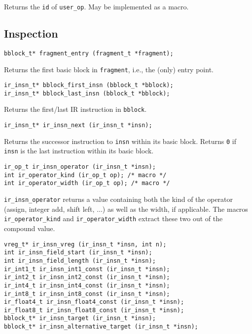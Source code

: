 \documentclass{article}
\newcommand{\cc}[1]{\texttt{#1}} %
\begin{document}
Returns the \cc{id} of \cc{user\_op}.  May be implemented as a macro.

\subsection{Inspection}

\begin{verbatim}
bblock_t* fragment_entry (fragment_t *fragment);
\end{verbatim}

Returns the first basic block in \cc{fragment}, i.e., the (only) entry
point.

\begin{verbatim}
ir_insn_t* bblock_first_insn (bblock_t *bblock);
ir_insn_t* bblock_last_insn (bblock_t *bblock);
\end{verbatim}

Returns the first/last IR instruction in \cc{bblock}.

\begin{verbatim}
ir_insn_t* ir_insn_next (ir_insn_t *insn);
\end{verbatim}

Returns the successor instruction to \cc{insn} within its basic block.
Returns \cc{0} if \cc{insn} is the last instruction within its basic
block.

\begin{verbatim}
ir_op_t ir_insn_operator (ir_insn_t *insn);
int ir_operator_kind (ir_op_t op); /* macro */
int ir_operator_width (ir_op_t op); /* macro */
\end{verbatim}

\cc{ir\_insn\_operator} returns a value containing both the kind of the
operator (assign, integer add, shift left, $\ldots$) as well as the
width, if applicable.  The macros \cc{ir\_operator\_kind} and
\cc{ir\_operator\_width} extract these two out of the compound value.

\begin{verbatim}
vreg_t* ir_insn_vreg (ir_insn_t *insn, int n);
int ir_insn_field_start (ir_insn_t *insn);
int ir_insn_field_length (ir_insn_t *insn);
ir_int1_t ir_insn_int1_const (ir_insn_t *insn);
ir_int2_t ir_insn_int2_const (ir_insn_t *insn);
ir_int4_t ir_insn_int4_const (ir_insn_t *insn);
ir_int8_t ir_insn_int8_const (ir_insn_t *insn);
ir_float4_t ir_insn_float4_const (ir_insn_t *insn);
ir_float8_t ir_insn_float8_const (ir_insn_t *insn);
bblock_t* ir_insn_target (ir_insn_t *insn);
bblock_t* ir_insn_alternative_target (ir_insn_t *insn);
\end{verbatim}
\end{document}

